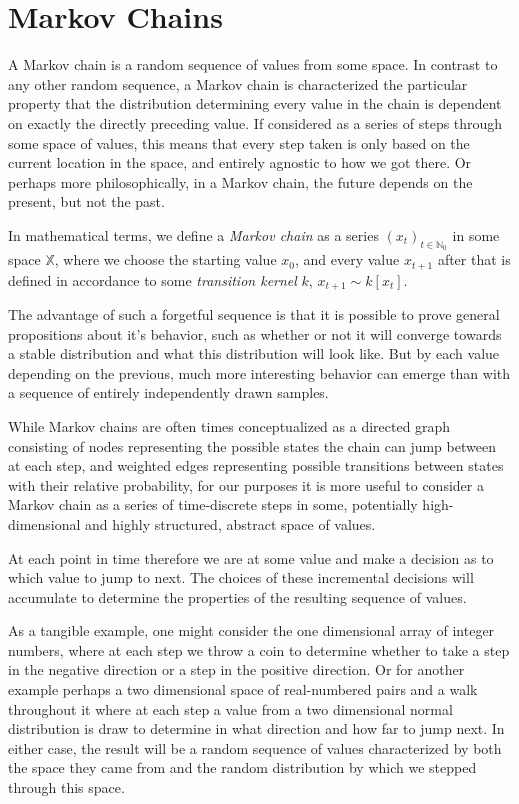 \section{Markov Chains}

A Markov chain is a random sequence of values from some space. In contrast to any other random sequence, a Markov chain is characterized the particular property that the distribution determining every value in the chain is dependent on exactly the directly preceding value. If considered as a series of steps through some space of values, this means that every step taken is only based on the current location in the space, and entirely agnostic to how we got there. Or perhaps more philosophically, in a Markov chain, the future depends on the present, but not the past.

In mathematical terms, we define a \textit{Markov chain} as a series $(x_t)_{t \in \mathbb{N}_0}$ in some space $\mathbb{X}$, where we choose the starting value $x_0$, and every value $x_{t + 1}$ after that is defined in accordance to some \textit{transition kernel} $k$, $x_{t+1} \sim k[x_t]$.

The advantage of such a forgetful sequence is that it is possible to prove general propositions about it's behavior, such as whether or not it will converge towards a stable distribution and what this distribution will look like. But by each value depending on the previous, much more interesting behavior can emerge than with a sequence of entirely independently drawn samples.

While Markov chains are often times conceptualized as a directed graph consisting of nodes representing the possible states the chain can jump between at each step, and weighted edges representing possible transitions between states with their relative probability, for our purposes it is more useful to consider a Markov chain as a series of time-discrete steps in some, potentially high-dimensional and highly structured, abstract space of values.

At each point in time therefore we are at some value and make a decision as to which value to jump to next. The choices of these incremental decisions will accumulate to determine the properties of the resulting sequence of values.

As a tangible example, one might consider the one dimensional array of integer numbers, where at each step we throw a coin to determine whether to take a step in the negative direction or a step in the positive direction. Or for another example perhaps a two dimensional space of real-numbered pairs and a walk throughout it where at each step a value from a two dimensional normal distribution is draw to determine in what direction and how far to jump next. In either case, the result will be a random sequence of values characterized by both the space they came from and the random distribution by which we stepped through this space.

